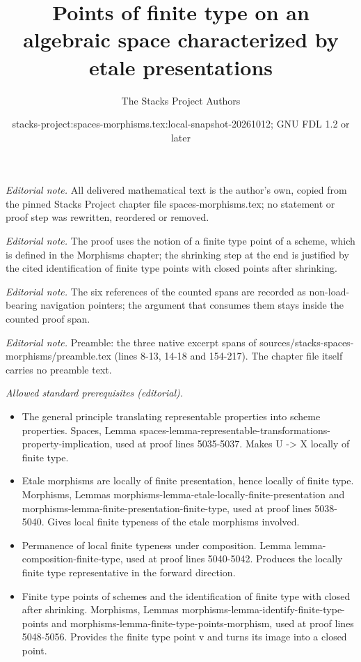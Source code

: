 \documentclass[10pt,a4paper]{amsart}
\title{Points of finite type on an algebraic space characterized by etale presentations}
\author{The Stacks Project Authors}
\date{stacks-project:spaces-morphisms.tex:local-snapshot-20261012; GNU FDL 1.2 or later}
\theoremstyle{plain}
\theoremstyle{definition}
\theoremstyle{remark}
\numberwithin{equation}{subsection}
\begin{document}
\maketitle
\setcounter{subsection}{1}
\noindent\textit{Editorial note.} All delivered mathematical text is the author's own, copied from the pinned Stacks Project chapter file spaces-morphisms.tex; no statement or proof step was rewritten, reordered or removed.\par\medskip
\noindent\textit{Editorial note.} The proof uses the notion of a finite type point of a scheme, which is defined in the Morphisms chapter; the shrinking step at the end is justified by the cited identification of finite type points with closed points after shrinking.\par\medskip
\noindent\textit{Editorial note.} The six references of the counted spans are recorded as non-load-bearing navigation pointers; the argument that consumes them stays inside the counted proof span.\par\medskip
\noindent\textit{Editorial note.} Preamble: the three native excerpt spans of sources/stacks-spaces-morphisms/preamble.tex (lines 8-13, 14-18 and 154-217). The chapter file itself carries no preamble text.\par\medskip
\noindent\textit{Allowed standard prerequisites (editorial).}\begin{itemize}
\item The general principle translating representable properties into scheme properties. Spaces, Lemma spaces-lemma-representable-transformations-property-implication, used at proof lines 5035-5037. Makes U -> X locally of finite type.
\item Etale morphisms are locally of finite presentation, hence locally of finite type. Morphisms, Lemmas morphisms-lemma-etale-locally-finite-presentation and morphisms-lemma-finite-presentation-finite-type, used at proof lines 5038-5040. Gives local finite typeness of the etale morphisms involved.
\item Permanence of local finite typeness under composition. Lemma lemma-composition-finite-type, used at proof lines 5040-5042. Produces the locally finite type representative in the forward direction.
\item Finite type points of schemes and the identification of finite type with closed after shrinking. Morphisms, Lemmas morphisms-lemma-identify-finite-type-points and morphisms-lemma-finite-type-points-morphism, used at proof lines 5048-5056. Provides the finite type point v and turns its image into a closed point.
\end{itemize}\medskip
\end{document}
